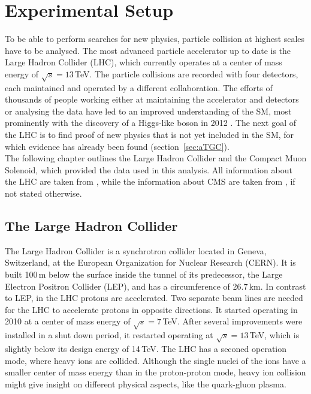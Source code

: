 \chapter{Experimental Setup}
\label{chap::ExperimentalSetup}
To be able to perform searches for new physics, particle collision at highest scales have to be analysed. The most advanced particle accelerator up to date is the Large Hadron Collider (LHC), which currently operates at a center of mass energy of $\sqrt{s}= 13$\,TeV. The particle collisions are recorded with four detectors, each maintained and operated by a different collaboration. The efforts of thousands of people working either at maintaining the accelerator and detectors or analysing the data have led to an improved understanding of the SM, most prominently with the discovery of a Higgs-like boson in 2012 \cite{cms_higgsdiscov,atlas_higgsdiscov}. The next goal of the LHC is to find proof of new physics that is not yet included in the SM, for which evidence has already been found (section~\ref{sec:aTGC}).\\

\noindent The following chapter outlines the Large Hadron Collider and the Compact Muon Solenoid, which provided the data used in this analysis. All information about the LHC are taken from \cite{lhc_machine}, while the information about CMS are taken from \cite{CMS}, if not stated otherwise.

\section{The Large Hadron Collider}
The Large Hadron Collider is a synchrotron collider located in Geneva, Switzerland, at the European Organization for Nuclear Research (CERN). It is built 100\,m below the surface inside the tunnel of its predecessor, the Large Electron Positron Collider (LEP), and has a circumference of 26.7\,km. In contrast to LEP, in the LHC protons are accelerated. Two separate beam lines are needed for the LHC to accelerate protons in opposite directions. It started operating in 2010 at a center of mass energy of $\sqrt{s}=7$\,TeV. After several improvements were installed in a shut down period, it restarted operating at $\sqrt{s}=13$\,TeV, which is slightly below its design energy of 14\,TeV. The LHC has a seconed operation mode, where heavy ions are collided. Although the single nuclei of the ions have a smaller center of mass energy than in the proton-proton mode, heavy ion collision might give insight on different physical aspects, like the quark-gluon plasma.\\

